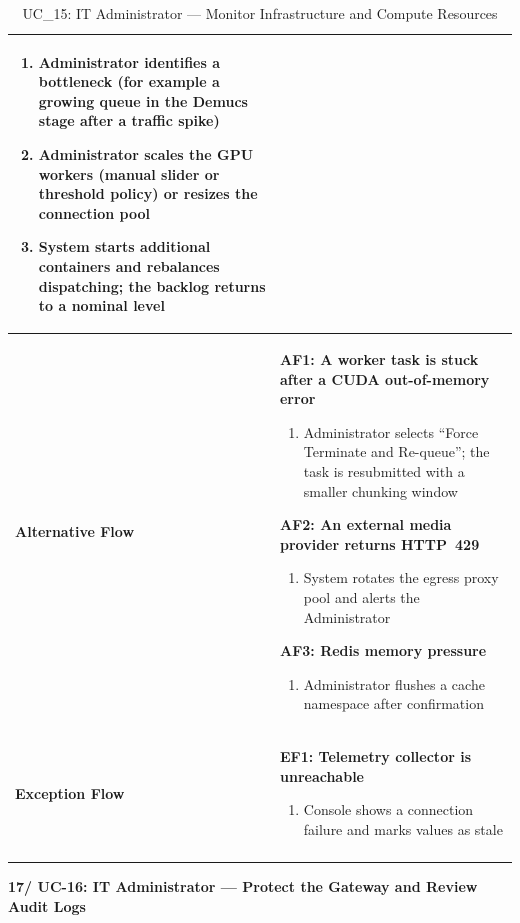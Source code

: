 \documentclass[a4paper]{article}
\newlength{\ucLeft}
\begin{document}
\begin{longtable}{|>{\bfseries}p{\ucLeft}|p{\dimexpr\linewidth-\ucLeft-2\tabcolsep-2\arrayrulewidth}|}
\begin{enumerate}[leftmargin=1.5em, nosep, topsep=2pt, partopsep=0pt, parsep=0pt, after=\strut]
    \item Administrator identifies a bottleneck (for example a growing queue in the Demucs stage after a traffic spike)
    \item Administrator scales the GPU workers (manual slider or threshold policy) or resizes the connection pool
    \item System starts additional containers and rebalances dispatching; the backlog returns to a nominal level
\end{enumerate}
\\ \hline
Alternative Flow &
\textbf{AF1: A worker task is stuck after a CUDA out-of-memory error}
\begin{enumerate}[leftmargin=1.5em, nosep, topsep=2pt, partopsep=0pt, parsep=0pt, after=\strut]
    \item Administrator selects ``Force Terminate and Re-queue''; the task is resubmitted with a smaller chunking window
\end{enumerate}
\textbf{AF2: An external media provider returns HTTP~429}
\begin{enumerate}[leftmargin=1.5em, nosep, topsep=2pt, partopsep=0pt, parsep=0pt, after=\strut]
    \item System rotates the egress proxy pool and alerts the Administrator
\end{enumerate}
\textbf{AF3: Redis memory pressure}
\begin{enumerate}[leftmargin=1.5em, nosep, topsep=2pt, partopsep=0pt, parsep=0pt, after=\strut]
    \item Administrator flushes a cache namespace after confirmation
\end{enumerate}
\\ \hline
Exception Flow &
\textbf{EF1: Telemetry collector is unreachable}
\begin{enumerate}[leftmargin=1.5em, nosep, topsep=2pt, partopsep=0pt, parsep=0pt, after=\strut]
    \item Console shows a connection failure and marks values as stale
\end{enumerate}
\\ \hline
\caption{UC\_15: IT Administrator --- Monitor Infrastructure and Compute Resources}\label{tab:uc15_infra}
\end{longtable}

\vspace{0.5em}
\noindent\textbf{17/ UC-16: IT Administrator --- Protect the Gateway and Review Audit Logs}
\end{document}
